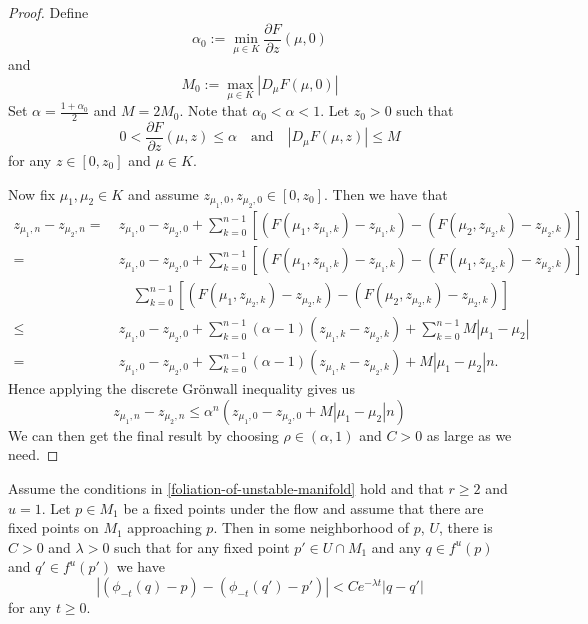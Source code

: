 \begin{proof}
	Define 
	\begin{equation}
		\alpha_0 := \min_{\mu\in K } \frac{\partial F}{\partial z} (\mu, 0) 
	\end{equation} 
	and 
	\begin{equation}
		M_0 := \max_{\mu\in K} \left| D_\mu F (\mu, 0) \right|
	\end{equation}
	Set \(\alpha = \frac{1 + \alpha_0}{2}\) and \(M = 2M_0\). Note that \(\alpha_0 < \alpha < 1\). Let \(z_0 > 0\) such that 
	\begin{equation}
		0 < \frac{\partial F}{\partial z} (\mu, z) \leq \alpha \quad \text{and} \quad \left| D_\mu F (\mu, z) \right| \leq M
	\end{equation}
	for any \(z \in [0,z_0]\) and \(\mu \in K\). 
	
	Now fix \(\mu_1,\mu_2\in K\) and assume \(z_{\mu_1, 0}, z_{\mu_2,0} \in [0,z_0]\). Then we have that 
	\begin{align*}
		z_{\mu_1, n} - z_{\mu_2, n}=\ &z_{\mu_1, 0}- z_{\mu_2, 0} + \sum_{k=0}^{n-1} [(F(\mu_1, z_{\mu_1,k} ) - z_{\mu_1, k}) - (F(\mu_2, z_{\mu_2,k} ) - z_{\mu_2, k})]\\
		=\ &z_{\mu_1, 0}- z_{\mu_2, 0} + \sum_{k=0}^{n-1} [(F(\mu_1, z_{\mu_1,k} ) - z_{\mu_1, k}) - (F(\mu_1, z_{\mu_2,k} ) - z_{\mu_2, k})] \\
		&\quad\sum_{k=0}^{n-1} [(F(\mu_1, z_{\mu_2,k} ) - z_{\mu_2, k}) - (F(\mu_2, z_{\mu_2,k} ) - z_{\mu_2, k})] \\
		\leq\ &z_{\mu_1, 0}- z_{\mu_2, 0} + \sum_{k=0}^{n-1} (\alpha - 1) (z_{\mu_1, k}- z_{\mu_2, k}) +\sum_{k=0}^{n-1} M|\mu_1 - \mu_2| \\
		=\ &z_{\mu_1, 0}- z_{\mu_2, 0} + \sum_{k=0}^{n-1} (\alpha - 1) (z_{\mu_1, k}- z_{\mu_2, k}) +M|\mu_1 - \mu_2| n.
	\end{align*}
	Hence applying the discrete Gr\"onwall inequality gives us
	\begin{equation}
		z_{\mu_1, n} - z_{\mu_2, n} \leq \alpha^n(z_{\mu_1, 0}- z_{\mu_2, 0} + M |\mu_1-\mu_2| n)
	\end{equation}
	We can then get the final result by choosing \(\rho \in (\alpha, 1)\) and \(C>0\) as large as we need.
\end{proof}

\begin{prop}
	Assume the conditions in \cref{foliation-of-unstable-manifold} hold and that \(r\geq 2\) and \(u = 1\). Let \(p \in {M}_1\) be a fixed points under the flow and assume that there are fixed points on \( M_1\) approaching \(p\). Then in some neighborhood of \(p\), \(U\), there is \(C> 0 \) and \(\lambda > 0\) such that for any fixed point \(p'\in U\cap M_1\) and any \(q \in f^u(p)\) and \(q'\in f^u(p')\) we have
	\begin{equation}
		|(\phi_{-t}(q) - p) - (\phi_{-t}(q') - p')| < C e^{-\lambda t} | q - q'|
	\end{equation}
	for any \(t\geq 0.\)
\end{prop}

